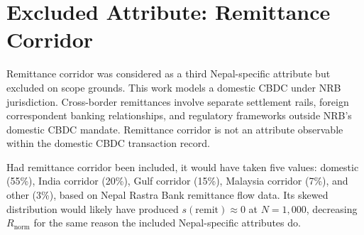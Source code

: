 \section*{Excluded Attribute: Remittance Corridor}

Remittance corridor was considered as a third Nepal-specific
attribute but excluded on scope grounds. This work models
a domestic CBDC under NRB jurisdiction. Cross-border
remittances involve separate settlement rails, foreign
correspondent banking relationships, and regulatory
frameworks outside NRB's domestic CBDC mandate. Remittance
corridor is not an attribute observable within the domestic
CBDC transaction record.

Had remittance corridor been included, it would have taken
five values: domestic (55\%), India corridor (20\%), Gulf
corridor (15\%), Malaysia corridor (7\%), and other (3\%),
based on Nepal Rastra Bank remittance flow data. Its skewed
distribution would likely have produced
$s(\text{remit}) \approx 0$ at $N = 1{,}000$, decreasing
$R_{\mathrm{norm}}$ for the same reason the included
Nepal-specific attributes do.